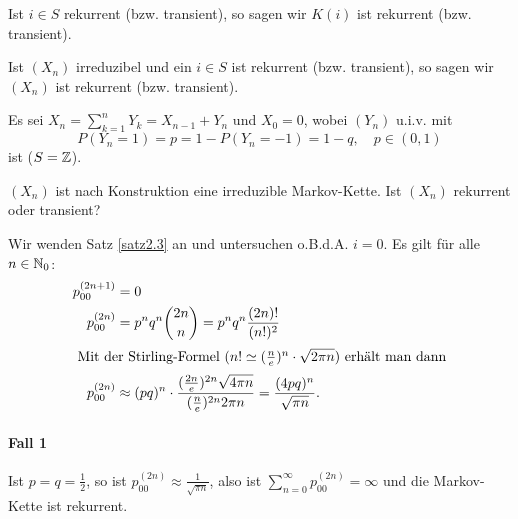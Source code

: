 \documentclass[a4paper,twoside,DIV15,BCOR12mm]{scrbook}
\begin{document}
\begin{bemerkung}
Ist $i\in S$ rekurrent (bzw. transient), so sagen wir $K(i)$ ist rekurrent (bzw. transient).

Ist $(X_n)$ irreduzibel und ein $i\in S$ ist rekurrent (bzw. transient), so sagen wir $(X_n)$ ist rekurrent (bzw. transient).
\end{bemerkung}

\begin{beispiel}
\label{bsp2.3}
Es sei $X_n=\sum_{k=1}^n Y_k = X_{n-1}+Y_n$ und $X_0=0$, wobei $(Y_n)$ u.i.v. mit \[P(Y_n=1)=p = 1 - P (Y_n=-1) =1-q,\quad p\in (0,1)\] ist ($S=\mathbb{Z}$).

\begin{center}
\end{center}
$(X_n)$ ist nach Konstruktion eine irreduzible Markov-Kette. Ist $(X_n)$ rekurrent oder transient?

Wir wenden Satz \ref{satz2.3} an und untersuchen o.B.d.A. $i=0$. Es gilt für alle $n\in \mathbb{N}_0$:
\begin{align*}
p_{00}^{(2n+1)} &= 0\\
p_{00}^{(2n)} &= p^nq^n \binom{2n}{n} = p^nq^n \frac{(2n)!}{(n!)^2}\\
\intertext{
Mit der Stirling-Formel ($n! \simeq (\frac n e )^n\cdot \sqrt{2\pi n}$) erhält man dann}
p_{00}^{(2n)} &\approx (pq)^n\cdot \frac{(\frac{2n}e)^{2n} \sqrt{4\pi n}}{(\frac ne) ^{2n} 2\pi n} = \frac{(4pq)^n}{\sqrt{\pi n}}.
\end{align*}

\paragraph{Fall 1} Ist $p=q=\frac12$, so ist $p_{00}^{(2n)} \approx \frac1{\sqrt{\pi n}}$, also ist $\sum_{n=0}^\infty p_{00}^{(2n)} = \infty$ und die Markov-Kette ist rekurrent.


\end{beispiel}
\end{document}
